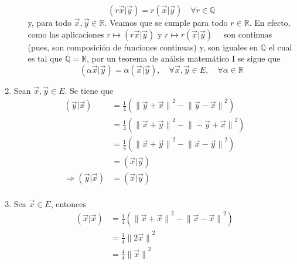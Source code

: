 \documentclass[12pt]{report}
\theoremstyle{largebreak}
\newcommand\pint[2]{\ensuremath{\left(#1\big|#2\right)}}
\newcommand\norm[1]{\ensuremath{\|#1\|}}
\begin{document}
\begin{sol}
\begin{enumerate}
\begin{enumerate}
                \begin{equation*}
                    \pint{r\vec{x}}{\vec{y}}=r\pint{\vec{x}}{\vec{y}}\quad\forall r\in\mathbb{Q}
                \end{equation*}
                y, para todo $\vec{x},\vec{y}\in\mathbb{R}$. Veamos que se cumple para todo $r\in\mathbb{R}$. En efecto, como las aplicaciones $r\mapsto \pint{r\vec{x}}{\vec{y}}$ y $r\mapsto r\pint{\vec{x}}{\vec{y}}\quad$ son continuas (pues, son composición de funciones continuas) y, son iguales en $\mathbb{Q}$ el cual es tal que $\overline{\mathbb{Q}}=\mathbb{R}$, por un teorema de análsis matemático I se sigue que
                \begin{equation*}
                    \pint{\alpha \vec{x}}{\vec{y}}=\alpha\pint{\vec{x}}{\vec{y}},\quad\forall\vec{x},\vec{y}\in E,\quad\forall \alpha\in\mathbb{R}
                \end{equation*}
            \end{enumerate}
            \item Sean $\vec{x},\vec{y}\in E$. Se tiene que 
            \begin{equation*}
                \begin{split}
                    \pint{\vec{y}}{\vec{x}}&=\frac{1}{4}\left(\norm{\vec{y}+\vec{x}}^2-\norm{\vec{y}-\vec{x}}^2 \right)\\
                    &=\frac{1}{4}\left(\norm{\vec{x}+\vec{y}}^2-\norm{-\vec{y}+\vec{x}}^2 \right)\\
                    &=\frac{1}{4}\left(\norm{\vec{x}+\vec{y}}^2-\norm{\vec{x}-\vec{y}}^2 \right)\\
                    &=\pint{\vec{x}}{\vec{y}}\\
                    \Rightarrow \pint{\vec{y}}{\vec{x}}&=\pint{\vec{x}}{\vec{y}}\\
                \end{split}
            \end{equation*}
            \item Sea $\vec{x}\in E$, entonces
            \begin{equation*}
                \begin{split}
                    \pint{\vec{x}}{\vec{x}}&=\frac{1}{4}\left(\norm{\vec{x}+\vec{x}}^2-\norm{\vec{x}-\vec{x}}^2 \right)\\
                    &=\frac{1}{4}\norm{2\vec{x}}^2\\
                    &=\frac{4}{4}\norm{\vec{x}}^2\\

\end{split}
\end{equation*}
\end{enumerate}
\end{sol}
\end{document}
